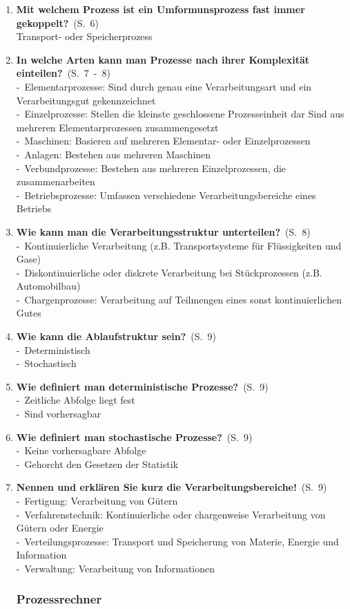 \documentclass[a4paper,12pt]{article}
\newcommand{\question}[3]{\pagebreak[3]\item {\textbf{#1?}}\ (S.\ #2)#3}
\newcommand{\statement}[3]{\pagebreak[3]\item {\textbf{#1!}}\ (S.\ #2)#3}
\newcommand{\catchword}[1]{\\-\ #1}
\newcommand{\normaltext}[1]{\\#1}
\newcommand{\page}[1]{#1}
\newcommand{\pages}[2]{#1\ -\ #2}
\begin{document}
\begin{enumerate}
  \question{Mit welchem Prozess ist ein Umformunsprozess fast immer gekoppelt}{\page{6}}
  {
    \normaltext{Transport- oder Speicherprozess}
  }

  \question{In welche Arten kann man Prozesse nach ihrer Komplexität einteilen}{\pages{7}{8}}
  {
    \catchword{Elementarprozesse: Sind durch genau eine Verarbeitungsart und ein
               Verarbeitungsgut gekennzeichnet}
    \catchword{Einzelprozesse: Stellen die kleinste geschlossene Prozesseinheit dar
               Sind aus mehreren Elementarprozessen zusammengesetzt}
    \catchword{Maschinen: Basieren auf mehreren Elementar- oder Einzelprozessen}
    \catchword{Anlagen: Bestehen aus mehreren Maschinen}
    \catchword{Verbundprozesse: Bestehen aus mehreren Einzelprozessen, die zusammenarbeiten}
    \catchword{Betriebsprozesse: Umfassen verschiedene Verarbeitungsbereiche eines Betriebs}
  }

  \question{Wie kann man die Verarbeitungsstruktur unterteilen}{\page{8}}
  {
    \catchword{Kontinuierliche Verarbeitung (z.B. Transportsysteme für Flüssigkeiten und Gase)}
    \catchword{Diskontinuierliche oder diskrete Verarbeitung bei Stückprozessen (z.B. Automobilbau)}
    \catchword{Chargenprozesse: Verarbeitung auf Teilmengen eines sonst kontinuierlichen Gutes}
  }

  \question{Wie kann die Ablaufstruktur sein}{\page{9}}
  {
    \catchword{Deterministisch}
    \catchword{Stochastisch}
  }

  \question{Wie definiert man deterministische Prozesse}{\page{9}}
  {
    \catchword{Zeitliche Abfolge liegt fest}
    \catchword{Sind vorhersagbar}
  }

  \question{Wie definiert man stochastische Prozesse}{\page{9}}
  {
    \catchword{Keine vorhersagbare Abfolge}
    \catchword{Gehorcht den Gesetzen der Statistik}
  }

  \statement{Nennen und erklären Sie kurz die Verarbeitungsbereiche}{\page{9}}
  {
    \catchword{Fertigung: Verarbeitung von Gütern}
    \catchword{Verfahrenstechnik: Kontinuierliche oder chargenweise Verarbeitung
               von Gütern oder Energie}
    \catchword{Verteilungsprozesse: Transport und Speicherung von Materie, Energie und Information}
    \catchword{Verwaltung: Verarbeitung von Informationen}
  }

  \subsubsection{Prozessrechner}


\end{enumerate}
\end{document}
